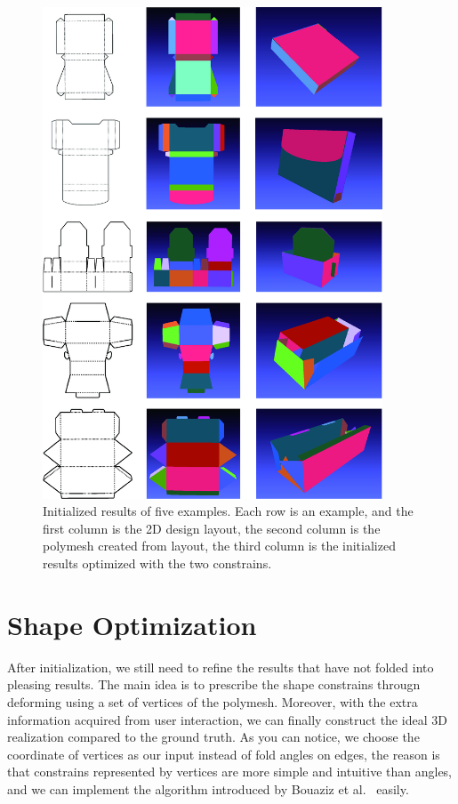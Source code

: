 \documentclass[submission]{gmp2018}
\begin{document}
\begin{figure}
	\centering
	\includegraphics[width=0.9\textwidth]{images/initial.jpg}
	\caption{Initialized results of five examples. Each row is an example, and the first column is the 2D design layout, the second column is the polymesh created from layout, the third column is the initialized results optimized with the two constrains.}
	\label{fig:initial}
\end{figure}


\section{Shape Optimization}\label{sec:optimization}


After initialization, we still need to refine the results that have not folded into pleasing results. The main idea is to prescribe the shape constrains througn deforming using a set of vertices of the polymesh. Moreover, with the extra information acquired from user interaction, we can finally construct the ideal 3D realization compared to the ground truth. As you can notice, we choose the coordinate of vertices as our input instead of fold angles on edges, the reason is that constrains represented by vertices are more simple and intuitive than angles, and we can implement the algorithm introduced by  Bouaziz et al.~\cite{Bouaziz:2012:SSD:2346796.2346802} easily.
\end{document}
